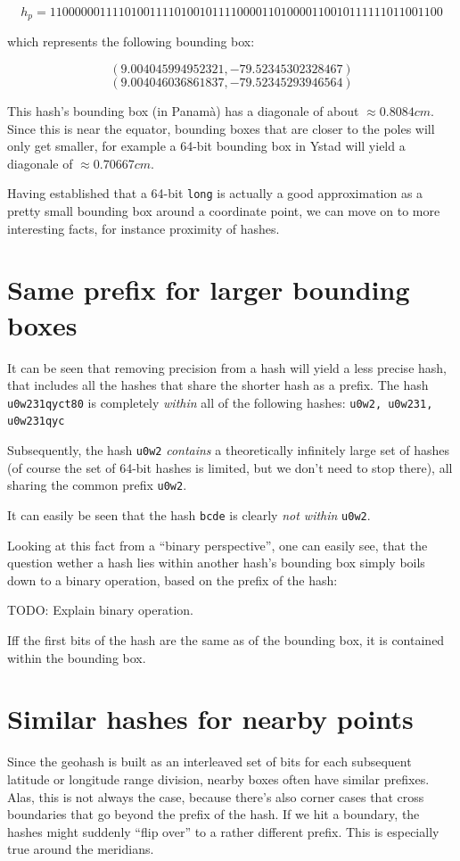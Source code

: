 \documentclass[a4paper,11pt,oneside]{scrartcl}
\begin{document}
\[
h_p = 110000001111010011110100101111000011010000110010111111011001100
\]

which represents the following bounding box:

\[
(9.004045994952321,-79.52345302328467)
\]
\[
(9.004046036861837,-79.52345293946564)
\]

This hash's bounding box (in Panamà) has a diagonale of about $\approx 0.8084 cm$. Since this is near the equator, bounding boxes that are closer to the poles will only get smaller, for example a 64-bit bounding box in Ystad will yield a diagonale of $\approx 0.70667 cm$.

Having established that a 64-bit \texttt{long} is actually a good approximation as a pretty small bounding box around a coordinate point, we can move on to more interesting facts, for instance proximity of hashes.


\section{Same prefix for larger bounding boxes} %
\label{sec:same_prefix_for_larger_bounding_boxes}
It can be seen that removing precision from a hash will yield a less precise hash, that includes all the hashes that share the shorter hash as a prefix.
The hash \texttt{u0w231qyct80} is completely \emph{within} all of the following hashes: \texttt{u0w2, u0w231, u0w231qyc}

Subsequently, the hash \texttt{u0w2} \emph{contains} a theoretically infinitely large set of hashes (of course the set of 64-bit hashes is limited, but we don't need to stop there), all sharing the common prefix \texttt{u0w2}.

It can easily be seen that the hash \texttt{bcde} is clearly \emph{not within} \texttt{u0w2}.

Looking at this fact from a “binary perspective”, one can easily see, that the question wether a hash lies within another hash's bounding box simply boils down to a binary operation, based on the prefix of the hash:

TODO: Explain binary operation.

Iff the first bits of the hash are the same as of the bounding box, it is contained within the bounding box.



\section{Similar hashes for nearby points} %
\label{sec:similar_hashes_for_nearby_pojnts}
Since the geohash is built as an interleaved set of bits for each subsequent latitude or longitude range division, nearby boxes often have similar prefixes. Alas, this is not always the case, because there's also corner cases that cross boundaries that go beyond the prefix of the hash. If we hit a boundary, the hashes might suddenly “flip over” to a rather different prefix. This is especially true around the meridians.
\end{document}
